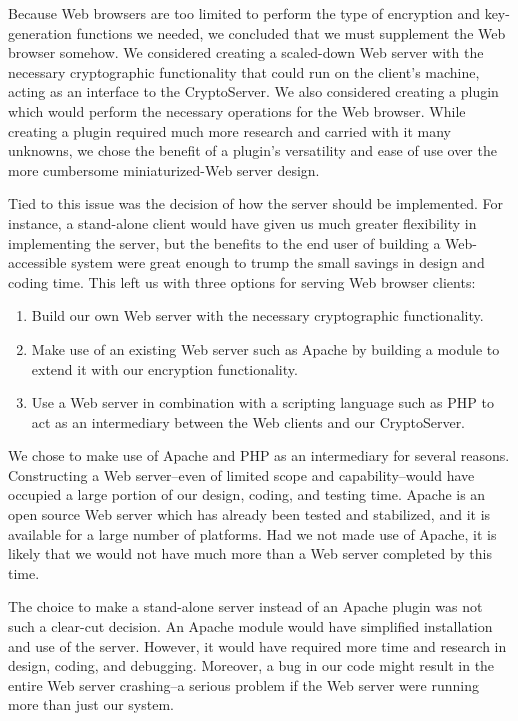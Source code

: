 \documentclass[letterpaper,10pt]{article}
\begin{document}
Because Web browsers are too limited to perform the type of encryption
and key-generation functions we needed, we concluded that we must
supplement the Web browser somehow. We considered creating a
scaled-down Web server with the necessary cryptographic functionality
that could run on the client's machine, acting as an interface to the
CryptoServer. We also considered creating a plugin which would perform
the necessary operations for the Web browser. While creating a plugin
required much more research and carried with it many unknowns, we chose
the benefit of a plugin's versatility and ease of use over the more
cumbersome miniaturized-Web server design.

Tied to this issue was the decision of how the server should be
implemented. For instance, a stand-alone client would have given us
much greater flexibility in implementing the server, but the benefits
to the end user of building a Web-accessible system were great enough
to trump the small savings in design and coding time. This left us
with three options for serving Web browser clients: 
\begin{enumerate}
\item Build our own Web server with the necessary cryptographic
  functionality.
\item Make use of an existing Web server such as Apache by building a
  module to extend it with our encryption functionality.
\item Use a Web server in combination with a scripting language such
  as PHP to act as an intermediary between the Web clients and our
  CryptoServer.
\end{enumerate}

We chose to make use of Apache and PHP as an intermediary for several
reasons. Constructing a Web server--even of limited scope and
capability--would have occupied a large portion of our design, coding,
and testing time. Apache is an open source Web server which has
already been tested and stabilized, and it is available for a large
number of platforms. Had we not made use of Apache, it is likely that
we would not have much more than a Web server completed by this time.

The choice to make a stand-alone server instead of an Apache plugin
was not such a clear-cut decision. An Apache module would have
simplified installation and use of the server. However, it would have
required more time and research in design, coding, and debugging.
Moreover, a bug in our code might result in the entire Web server
crashing--a serious problem if the Web server were running more than
just our system.
\end{document}
